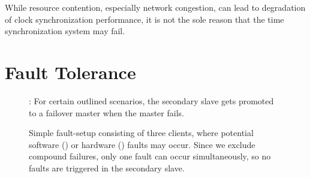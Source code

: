 While resource contention, especially network congestion, can lead to degradation of clock synchronization performance, it is not the sole reason that the time synchronization system may fail.


\section{Fault Tolerance}
\newcommand{\faultLength}{30 seconds}

\begin{figure}
    \begin{center}
    \end{center}

    \scriptsize *: For certain outlined scenarios, the secondary slave gets promoted to a failover master when the master fails.

    \caption{
        Simple fault-setup consisting of three clients, where potential software (\faBug{}) or hardware (\faBolt{}) faults may occur. Since we exclude compound failures, only one fault can occur simultaneously, so no faults are triggered in the secondary slave.
    }
    \label{fig:fault_architecture}
\end{figure}

